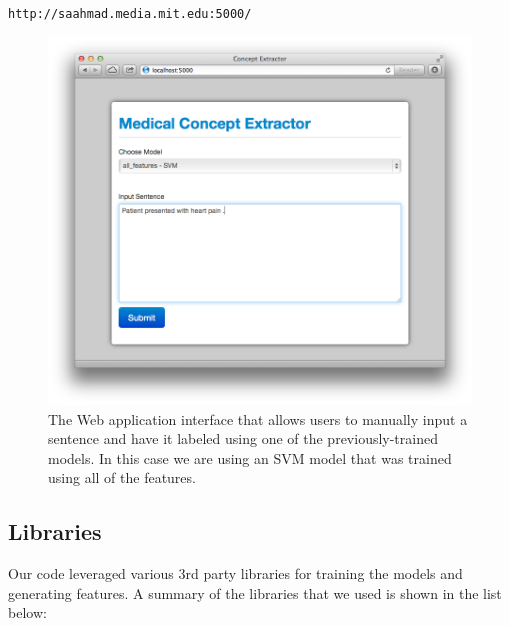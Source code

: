 \documentclass[preprint]{style}
\begin{document}
{\tt http://saahmad.media.mit.edu:5000/ }

\begin{figure}
\begin{center}
	\includegraphics[width=1\columnwidth]{figures/web-interface.png}
\end{center}
\caption{The Web application interface that allows users to manually input a sentence and have it labeled using one of the previously-trained models. In this case we are using an SVM model that was trained using all of the features.}
\label{fig:web_interface}
\end{figure}


\subsection{Libraries}

Our code leveraged various 3rd party libraries for training the models and generating features. A summary of the libraries that we used is shown in the list below:
\end{document}
